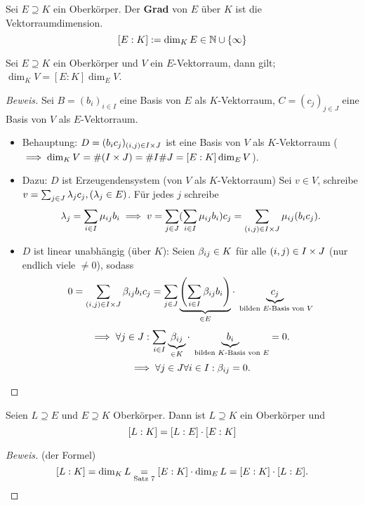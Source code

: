 \documentclass[a4paper]{report}
\begin{document}
\begin{defi}
  Sei $E \supseteq K$ ein Oberkörper. Der \textbf{Grad} von $E$ über $K$ ist die Vektorraumdimension.
  \[[E:K]:= \dim_{K}E \in \mathbb{N} \cup \{\infty\}\]
\end{defi}

\begin{satz}
  Sei $E \supseteq K$ ein Oberkörper und $V$ ein $E$-Vektorraum, dann gilt; $\dim_{K}V = [E:K]\dim_{E}V$.
    \begin{proof}[Beweis]
      Sei $B = (b_{i})_{i \in I}$ eine Basis von $E$ als $K$-Vektorraum, $C = (c_{j})_{j \in J}$ eine Basis von $V$ als $E$-Vektorraum.
      \begin{itemize}
        \item Behauptung: $D = (b_{i}c_{j})_{(i,j) \in I \times J}$ ist eine Basis von $V$ als $K$-Vektorraum ($\implies \dim_{K}V = \#(I \times J) = \#I \#J = [E : K] \dim_{E}V$).
        \item Dazu: $D$ ist Erzeugendensystem (von $V$ als $K$-Vektorraum) Sei $v \in V$, schreibe $v = \sum_{j \in J}\lambda_{j}c_{j}, (\lambda_{j} \in E)$. Für jedes $j$ schreibe
        \[\lambda_{j} = \sum_{i \in I} \mu_{ij} b_{i} \implies v = \sum_{j \in J}(\sum_{i \in I} \mu_{ij}b_{i})c_{j} = \sum_{(i, j) \in I \times J}\mu_{ij}(b_{i}c_{j}).\]
        \item $D$ ist linear unabhängig (über $K$):
              Seien $\beta_{ij} \in K$ für alle $(i, j) \in I \times J$ (nur endlich viele $\ne 0$), sodass
              \[0 = \sum_{(i,j) \in I \times J}\beta_{ij}b_{i}c_{j} = \sum_{j \in J}\underbrace{\left(\sum_{i \in I}\beta_{ij}b_{i}\right)}_{\in E}\cdot \underbrace{c_{j}}_{\text{ bilden } E\text{-Basis von } V} \]
              \[\implies \forall j \in J: \sum_{i \in I}\underbrace{\beta_{ij}}_{\in K} \cdot \underbrace{b_{i}}_{\text{ bilden } K\text{-Basis von } E} = 0.\]
              \[\implies \forall j \in J \forall i \in I: \beta_{ij} = 0. \qedhere\]
      \end{itemize}
    \end{proof}
\end{satz}

\begin{kor}
  Seien $L \supseteq E$ und $E \supseteq K$ Oberkörper. Dann ist $L \supseteq K$ ein Oberkörper und \[[L:K] = [L:E]\cdot[E:K]\]
  \begin{proof}[Beweis] (der Formel)
    \[[L:K] = \dim_{K} L \underset{\text{Satz 7}}= [E:K]\cdot \dim_{E}L = [E:K]\cdot [L:E].\]
  \end{proof}
\end{kor}
\end{document}
